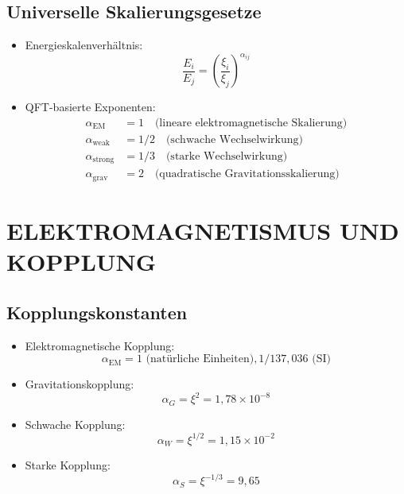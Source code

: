 \documentclass[12pt,a4paper]{article}
\begin{document}
	\subsection{Universelle Skalierungsgesetze}
	\begin{itemize}
		\item Energieskalenverhältnis:
		$$\frac{E_i}{E_j} = \left(\frac{\xi_i}{\xi_j}\right)^{\alpha_{ij}}$$
		
		\item QFT-basierte Exponenten:
		\begin{align*}
			\alpha_{\text{EM}} &= 1 \quad \text{(lineare elektromagnetische Skalierung)}\\
			\alpha_{\text{weak}} &= 1/2 \quad \text{(schwache Wechselwirkung)}\\
			\alpha_{\text{strong}} &= 1/3 \quad \text{(starke Wechselwirkung)}\\
			\alpha_{\text{grav}} &= 2 \quad \text{(quadratische Gravitationsskalierung)}
		\end{align*}
	\end{itemize}
	
	\section{ELEKTROMAGNETISMUS UND KOPPLUNG}
	
	\subsection{Kopplungskonstanten}
	\begin{itemize}
		\item Elektromagnetische Kopplung:
		$$\alpha_{\text{EM}} = 1 \text{ (natürliche Einheiten)}, 1/137{,}036 \text{ (SI)}$$
		
		\item Gravitationskopplung:
		$$\alpha_G = \xi^2 = 1{,}78 \times 10^{-8}$$
		
		\item Schwache Kopplung:
		$$\alpha_W = \xi^{1/2} = 1{,}15 \times 10^{-2}$$
		
		\item Starke Kopplung:
		$$\alpha_S = \xi^{-1/3} = 9{,}65$$
	\end{itemize}
	
\end{document}
